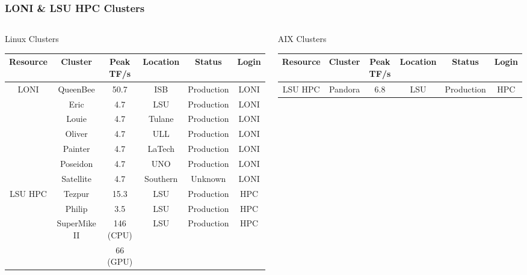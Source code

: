 \documentclass[slidestop,mathserif,compress,xcolor=svgnames,table]{beamer}
\begin{document}
\begin{frame}
  \frametitle{\small LONI \& LSU HPC Clusters}
  \begin{columns}
    \column{11cm}
    \vspace{-0.7cm}
  \footnotesize{
    \begin{block}{Linux Clusters}
      \begin{center}
        \begin{tabular}{|c|c|c|c|c|c|}
          \hline
          Resource & Cluster & Peak TF/s & Location & Status & Login\\
          \hline
          \multirow{6}{*}{LONI} & QueenBee & 50.7 & ISB & Production & LONI \\
          & Eric & 4.7 & LSU & Production & LONI\\
          & Louie & 4.7 & Tulane & Production & LONI\\
          & Oliver & 4.7 & ULL & Production & LONI\\
          & Painter & 4.7 & LaTech & Production & LONI\\
          & Poseidon & 4.7 & UNO & Production & LONI\\
          & Satellite & 4.7 & Southern & Unknown & LONI\\
          \hline
          \multirow{4}{*}{ LSU HPC} & Tezpur & 15.3 & LSU & Production & HPC\\
          & Philip & 3.5 & LSU & Production & HPC\\
          \cline{2-6}
          & \multirow{2}{*}{SuperMike II} & 146 (CPU) & \multirow{2}{*}{LSU} & \multirow{2}{*}{Production} & \multirow{2}{*}{HPC} \\
          &                            & 66 (GPU) & &  & \\
          \hline
        \end{tabular}
      \end{center}
    \end{block}
    \begin{block}{AIX Clusters}
      \begin{center}
        \def\firstrowcolor{\rowcolor{green}}
        \def\secondrowcolor{\rowcolor{blue!50}}
        \def\thirdrowcolor{\rowcolor{tigerspurple!80}}
        \begin{tabular}{|c|c|c|c|c|c|}
          \hline
          Resource & Cluster & Peak TF/s & Location & Status & Login\\
          \hline
          LSU HPC & Pandora & 6.8 & LSU & Production & HPC\\
          \hline
        \end{tabular}
      \end{center}
    \end{block}
  }
  \end{columns}
\end{frame}
\end{document}
